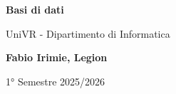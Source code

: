 \begin{titlepage}
	\begin{center}
		\vspace*{1cm}

		\Huge
		\textbf{Basi di dati}

		\vspace{0.5cm}
		\LARGE
		UniVR - Dipartimento di Informatica

		\vspace{1.5cm}

		\textbf{Fabio Irimie, Legion}

		\vfill


		\vspace{0.8cm}


		1° Semestre 2025/2026

	\end{center}
\end{titlepage}
